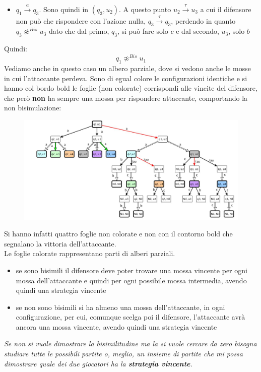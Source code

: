 \begin{esempio}
\begin{itemize}
    
    \item $q_1\stackrel{a}{\rightarrow}q_3$. Sono quindi in $(q_3, u_2)$. A
    questo punto $u_2\stackrel{\tau}{\rightarrow}u_3$ a cui il difensore non
    può che rispondere con l’azione nulla, $q_3\stackrel{\tau}{\rightarrow}q_3$,
    perdendo in quanto $q_3\not\approx^{Bis} u_3$ dato che dal primo, $q_3$,
    si può fare solo $c$ e dal secondo, $u_3$, solo $b$
  \end{itemize}
  Quindi:
  \[q_1\not\approx^{Bis} u_1\]
  Vediamo anche in questo caso un albero parziale, dove si vedono anche le mosse
  in cui l'attaccante perdeva. Sono di egual colore le configurazioni identiche
  e si hanno col bordo bold le foglie (non colorate) corrispondi alle vincite
  del difensore, 
  che però \textbf{non} ha sempre una mossa per rispondere attaccante, comportando la non
  bisimulazione:
  
  \begin{figure}[H]
    \centering
    \includegraphics[scale = 0.31]{img/alb2.jpg}
  \end{figure}
  Si hanno infatti quattro foglie non colorate e non con il contorno bold che
  segnalano la vittoria dell'attaccante.\\
  Le foglie colorate rappresentano parti di alberi parziali.
\end{esempio}
\begin{itemize}
  \item se sono bisimili il difensore deve poter trovare una mossa vincente per
  ogni mossa dell'attaccante e quindi per ogni possibile mossa intermedia,
  avendo quindi una strategia vincente
  \item se non sono bisimili si ha almeno una mossa dell'attaccante, in ogni
  configurazione, per cui, comunque scelga poi il difensore, l'attaccante avrà
  ancora una mossa vincente, avendo quindi una strategia vincente
\end{itemize}
\textit{Se non si vuole dimostrare la bisimilitudine ma la si vuole cercare da
  zero bisogna studiare tutte le possibili partite o, meglio, un insieme di
  partite che mi possa dimostrare quale dei due giocatori ha la
  \textbf{strategia vincente}.}\\
